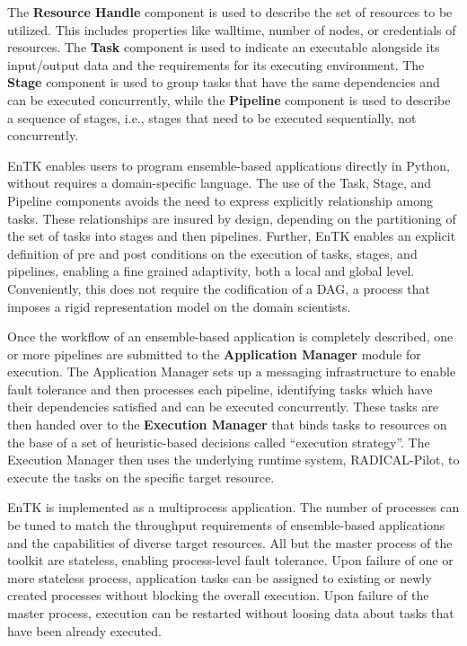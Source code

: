 The \textbf{Resource Handle} component is used to describe the set of
resources to be utilized. This includes properties like walltime, number of
nodes, or credentials of resources. The \textbf{Task} component is used to
indicate an executable alongside its input/output data and the requirements
for its executing environment. The \textbf{Stage} component is used to group
tasks that have the same dependencies and can be executed concurrently, while
the \textbf{Pipeline} component is used to describe a sequence of stages,
i.e., stages that need to be executed sequentially, not concurrently.

EnTK enables users to program ensemble-based applications directly in Python,
without requires a domain-specific language. The use of the Task, Stage, and
Pipeline components avoids the need to express explicitly relationship among
tasks. These relationships are insured by design, depending on the
partitioning of the set of tasks into stages and then pipelines. Further,
EnTK enables an explicit definition of pre and post conditions on the
execution of tasks, stages, and pipelines, enabling a fine grained
adaptivity, both a local and global level. Conveniently, this does not
require the codification of a DAG, a process that imposes a rigid
representation model on the domain scientists.

Once the workflow of an ensemble-based application is completely described,
one or more pipelines are submitted to the \textbf{Application Manager}
module for execution. The Application Manager sets up a messaging
infrastructure to enable fault tolerance and then processes each pipeline,
identifying tasks which have their dependencies satisfied and can be executed
concurrently. These tasks are then handed over to the \textbf{Execution
Manager} that binds tasks to resources on the base of a set of
heuristic-based decisions called ``execution strategy''. The Execution Manager
then uses the underlying runtime system, RADICAL-Pilot, to execute the tasks
on the specific target resource.

EnTK is implemented as a multiprocess application. The number of processes
can be tuned to match the throughput requirements of ensemble-based
applications and the capabilities of diverse target resources. All but the
master process of the toolkit are stateless, enabling process-level fault
tolerance. Upon failure of one or more stateless process, application tasks
can be assigned to existing or newly created processes without blocking the
overall execution. Upon failure of the master process, execution can be
restarted without loosing data about tasks that have been already executed.

